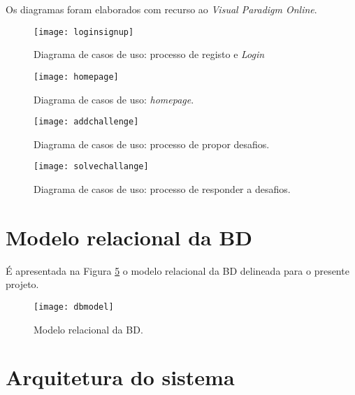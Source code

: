 Os diagramas foram elaborados com recurso ao \textit{Visual Paradigm Online}.

\begin{figure}[!htbp]
    \centering
    \texttt{[image: loginsignup]}	\caption[Diagrama de casos de uso: processo de registo e \emph{Login}]{Diagrama de casos de uso: processo de registo e \emph{Login}}
    \label{fig::casos-uso-regis}
\end{figure}

\begin{figure}[!htbp]
    \centering
    \texttt{[image: homepage]}
    \caption[Diagrama de casos de uso: \emph{homepage}]{Diagrama de casos de uso: \emph{homepage}.}
    \label{fig::casos-uso-homepage}
\end{figure}

\begin{figure}[!htbp]
    \centering
    \texttt{[image: addchallenge]}
    \caption[Diagrama de casos de uso: processo de propor desafios]{Diagrama de casos de uso: processo de propor desafios.}
    \label{fig::casos-uso-propdesafio}
\end{figure}

\begin{figure}[!htbp]
    \centering
    \texttt{[image: solvechallange]}
    \caption[Diagrama de casos de uso: processo de responder a desafios]{Diagrama de casos de uso: processo de responder a desafios.}
    \label{fig::casos-uso-repdesafio}
\end{figure}



\section{Modelo relacional da \acl{BD}}
\label{sec::engsoft:db}

É apresentada na Figura \ref{fig::diagrama-db} o modelo relacional da \acl{BD} delineada para o presente projeto.

\begin{figure}[!htbp]
    \centering
    \texttt{[image: dbmodel]}
    \caption[Modelo relacional]{Modelo relacional da \acl{BD}.}
    \label{fig::diagrama-db}
\end{figure}



\section{Arquitetura do sistema}
\label{sec::engsoft:arquitetura-sistema}

